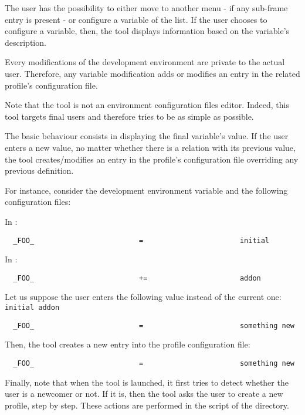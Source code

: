 The user has the possibility to either move to another menu - if any sub-frame
entry is present - or configure a variable of the list. If the user chooses
to configure a variable, then, the tool displays information based on the
variable's description.

Every modifications of the development environment are private to the actual
user. Therefore, any variable modification adds or modifies an entry in the
related  profile's configuration file.

Note that the  tool is not an environment configuration
files editor. Indeed, this tool targets final users and therefore tries to
be as simple as possible.

The basic  behaviour consists in displaying the final
variable's value. If the user enters a new value, no matter whether there is
a relation with its previous value, the tool creates/modifies an entry in the
 profile's configuration file overriding any previous definition.

For instance, consider the  development environment variable
and the following configuration files:

In :

\begin{verbatim}
  _FOO_                         =                       initial
\end{verbatim}

In :

\begin{verbatim}
  _FOO_                         +=                      addon
\end{verbatim}

Let us suppose the user enters the following value instead of the current
one: \verb|initial addon|

\begin{verbatim}
  _FOO_                         =                       something new
\end{verbatim}

Then, the  tool creates a new entry into the 
profile configuration file:

\begin{verbatim}
  _FOO_                         =                       something new
\end{verbatim}

Finally, note that when the  tool is launched, it first
tries to detect whether the user is a newcomer or not. If it is, then the
tool asks the user to create a new  profile, step by step. These
actions are performed in the  script of the
 directory.

